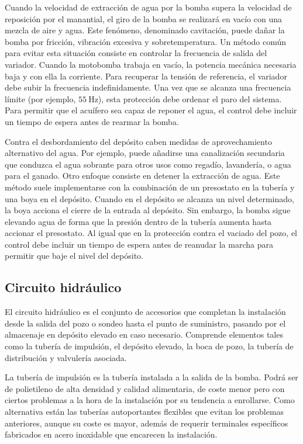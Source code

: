 Cuando la velocidad de extracción de agua por la bomba supera la velocidad
de reposición por el manantial, el giro de la bomba se realizará en
vacío con una mezcla de aire y agua. Este fenómeno, denominado cavitación,
puede dañar la bomba por fricción, vibración excesiva y sobretemperatura.
Un método común para evitar esta situación consiste en controlar la
frecuencia de salida del variador. Cuando la motobomba trabaja en
vacío, la potencia mecánica necesaria baja y con ella la corriente.
Para recuperar la tensión de referencia, el variador debe subir la
frecuencia indefinidamente. Una vez que se alcanza una frecuencia
límite (por ejemplo, $\SI{55}{\hertz}$), esta protección debe ordenar
el paro del sistema. Para permitir que el acuífero sea capaz de reponer
el agua, el control debe incluir un tiempo de espera antes de rearmar
la bomba.

Contra el desbordamiento del depósito caben medidas de aprovechamiento
alternativo del agua. Por ejemplo, puede añadirse una canalización
secundaria que conduzca el agua sobrante para otros usos como regadío,
lavandería, o agua para el ganado. Otro enfoque consiste en detener
la extracción de agua. Este método suele implementarse con la combinación
de un presostato en la tubería y una boya en el depósito. Cuando en
el depósito se alcanza un nivel determinado, la boya acciona el cierre
de la entrada al depósito. Sin embargo, la bomba sigue elevando agua
de forma que la presión dentro de la tubería aumenta hasta accionar
el presostato. Al igual que en la protección contra el vaciado del
pozo, el control debe incluir un tiempo de espera antes de reanudar
la marcha para permitir que baje el nivel del depósito.


\subsection{Circuito hidráulico}

El circuito hidráulico es el conjunto de accesorios que completan
la instalación desde la salida del pozo o sondeo hasta el punto de
suministro, pasando por el almacenaje en depósito elevado en caso
necesario. Comprende elementos tales como la tubería de impulsión,
el depósito elevado, la boca de pozo, la tubería de distribución y
valvulería asociada. 

La tubería de impulsión es la tubería instalada a la salida de la
bomba. Podrá ser de polietileno de alta densidad y calidad alimentaria,
de coste menor pero con ciertos problemas a la hora de la instalación
por su tendencia a enrollarse. Como alternativa están las tuberías
autoportantes flexibles que evitan los problemas anteriores, aunque
su coste es mayor, además de requerir terminales específicos fabricados
en acero inoxidable que encarecen la instalación. 

